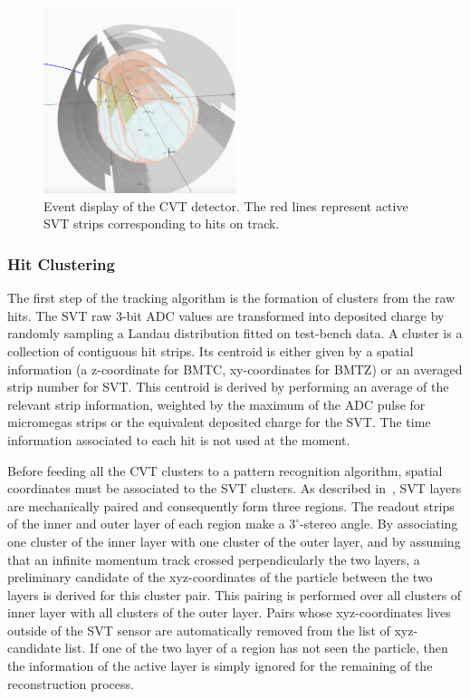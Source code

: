 \begin{figure}
\centering
\includegraphics[width=0.5\textwidth]{pics/cvt.png}
\caption{Event display of the CVT detector. The red lines represent active SVT strips corresponding to hits on track. 
}
\label{fig:cvt}
\end{figure}

\subsubsection{Hit Clustering}
The first step of the tracking algorithm is the formation of clusters from the raw hits. The SVT raw 3-bit ADC values
are transformed into deposited charge by randomly sampling a Landau distribution fitted on test-bench data. A cluster
is a collection of contiguous hit strips. Its centroid is either given by a spatial information (a z-coordinate for
BMTC, xy-coordinates for BMTZ) or an averaged strip number for SVT. This centroid is derived by performing an average of
the relevant strip information, weighted by the maximum of the ADC pulse for micromegas strips or the equivalent
deposited charge for the SVT.
The time information associated to each hit is not used at the moment.

Before feeding all the CVT clusters to a pattern recognition algorithm, spatial coordinates must be associated to the
SVT clusters. As described in~\cite{svt-nim}, SVT layers are mechanically paired and consequently form three regions.
The readout strips of the inner and outer layer of each region make a $3^\circ$-stereo angle. By associating one
cluster of the inner layer with one cluster of the outer layer, and by assuming that an infinite momentum track crossed
perpendicularly the two layers, a preliminary candidate of the xyz-coordinates of the particle between the two layers
is derived for this cluster pair. This pairing is performed over all clusters of inner layer with all clusters of the
outer layer. Pairs whose xyz-coordinates lives outside of the SVT sensor are automatically removed from the list of
xyz-candidate list. If one of the two layer of a region has not seen the particle, then the information of the active
layer is simply ignored for the remaining of the reconstruction process.

